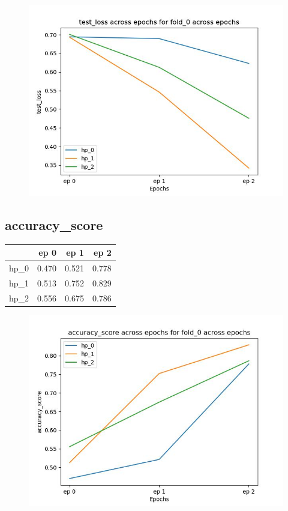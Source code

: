 \documentclass{article}
\begin{document}
\begin{figure}[H]
\includegraphics[scale = 0.75]{fold_0/test_loss}
\end{figure}
\subsection{accuracy\_score}
\begin{tabular}{lrrr}
\toprule
{} &   ep 0 &   ep 1 &   ep 2 \\
\midrule
hp\_0 &  0.470 &  0.521 &  0.778 \\
hp\_1 &  0.513 &  0.752 &  0.829 \\
hp\_2 &  0.556 &  0.675 &  0.786 \\
\bottomrule
\end{tabular}

\begin{figure}[H]
\includegraphics[scale = 0.75]{fold_0/accuracy_score}
\end{figure}
\end{document}
